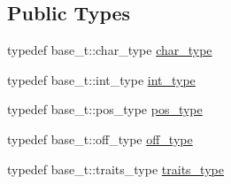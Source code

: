 \subsection*{Public Types}
\begin{DoxyCompactItemize}
\item 
typedef base\+\_\+t\+::char\+\_\+type \hyperlink{classecto_1_1py_1_1streambuf_acd255be6a50678c600c431c5bea7bc7b}{char\+\_\+type}
\item 
typedef base\+\_\+t\+::int\+\_\+type \hyperlink{classecto_1_1py_1_1streambuf_a1bfd3d3f54b7b91a5ea54f980436a617}{int\+\_\+type}
\item 
typedef base\+\_\+t\+::pos\+\_\+type \hyperlink{classecto_1_1py_1_1streambuf_afdd3f60ff0d0b2f4645742690b7d27dd}{pos\+\_\+type}
\item 
typedef base\+\_\+t\+::off\+\_\+type \hyperlink{classecto_1_1py_1_1streambuf_aa01772d1599fc51089a209a69fcab7c7}{off\+\_\+type}
\item 
typedef base\+\_\+t\+::traits\+\_\+type \hyperlink{classecto_1_1py_1_1streambuf_aaf8a5185360343bec29d804d5b416417}{traits\+\_\+type}
\end{DoxyCompactItemize}
